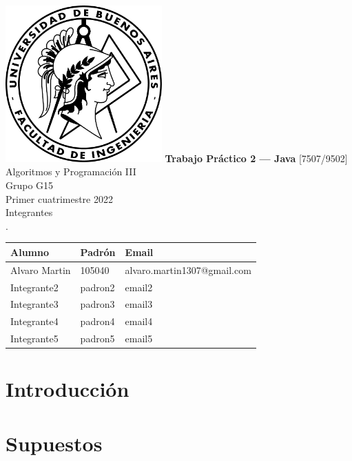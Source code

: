 \documentclass[titlepage,a4paper]{article}
\begin{document}
\begin{titlepage} %
	\hfill\includegraphics[width=6cm]{logofiuba.jpg}
    \centering
    \vfill
    \Huge \textbf{Trabajo Práctico 2 — Java}
    \vskip2cm
    \Large [7507/9502] Algoritmos y Programación III\\
    Grupo G15 \\
    Primer cuatrimestre 2022 \\
    \vfill
    Integrantes \\
    .\\
    \begin{tabular}{ | l | l | l | } %
      \hline
      Alumno & Padrón & Email \\ \hline
      Alvaro Martin & 105040 & alvaro.martin1307@gmail.com \\ \hline
      Integrante2 & padron2 & email2 \\ \hline
      Integrante3 & padron3 & email3 \\ \hline
      Integrante4 & padron4 & email4 \\ \hline
      Integrante5 & padron5 & email5 \\ \hline
  	\end{tabular}
    \vfill
    \vfill
\end{titlepage}

\tableofcontents %
\newpage

\section{Introducción}\label{sec:intro}

\section{Supuestos}\label{sec:supuestos}
\end{document}
